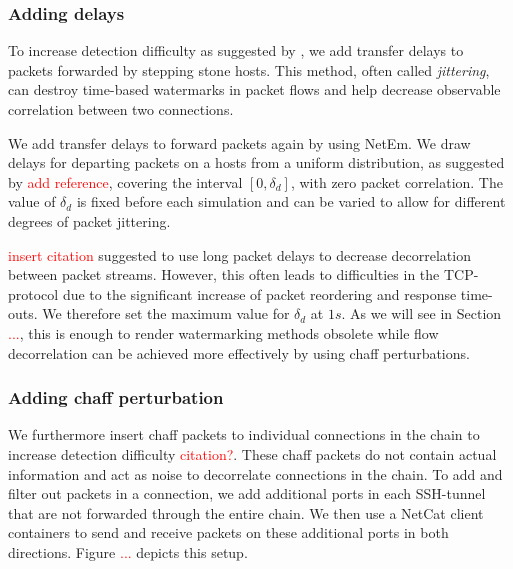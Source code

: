 \documentclass[conference]{IEEEtran}\usepackage[]{graphicx}\usepackage[]{color}
\begin{document}



\subsubsection{Adding delays}\label{Sec:delays_desc}

To increase detection difficulty as suggested by  \cite{padhye2010evading}, we add transfer delays to packets forwarded by stepping stone hosts. This method, often called \textit{jittering}, can destroy time-based watermarks in packet flows and help decrease observable correlation between two connections. 

We add transfer delays to forward packets again by using NetEm. We draw delays for departing packets on a hosts from a uniform distribution, as suggested by \textcolor{red}{add reference}, covering the interval $[0,\delta_d]$, with zero packet correlation. The value of $\delta_d$ is fixed before each simulation and can be varied to allow for different degrees of packet jittering. 

\textcolor{red}{insert citation} suggested to use long packet delays to decrease decorrelation between packet streams. However, this often leads to difficulties in the TCP-protocol due to the significant increase of packet reordering and response time-outs. We therefore set the maximum value for  $\delta_d$  at $1s$. As we will see in Section \textcolor{red}{...}, this is enough to render watermarking methods obsolete while flow decorrelation can be achieved more effectively by using chaff perturbations. 





\subsubsection{Adding chaff perturbation}\label{Sec:chaff_desc}

We furthermore insert chaff packets to individual connections in the chain to increase detection difficulty \textcolor{red}{citation?}. These chaff packets do not contain actual information and act as noise to decorrelate connections in the chain. To add and filter out packets in a connection, we add additional ports in each SSH-tunnel that are not forwarded through the entire chain.
We then use a NetCat client containers to send and receive packets on these additional ports in both directions. Figure \textcolor{red}{...} depicts this setup. 
\end{document}
